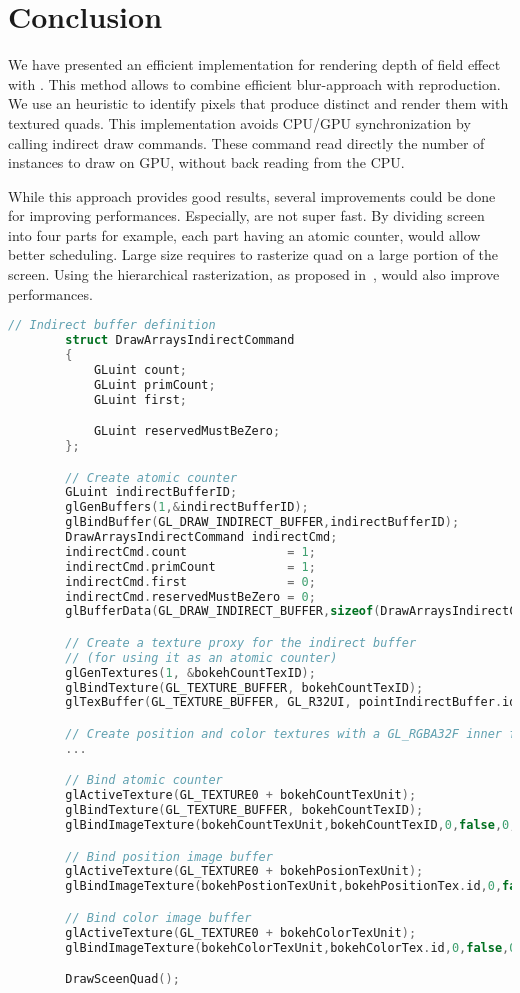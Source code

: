 \section{Conclusion}
We have presented an efficient implementation for rendering depth of field effect with \bokehs. This method allows to combine efficient blur-approach with \bokeh reproduction. We use an heuristic to identify pixels that produce distinct \bokeh and render them with textured quads. This implementation avoids CPU/GPU synchronization by calling indirect draw commands. These command read directly the number of instances to draw on GPU, without back reading from the CPU.


While this approach provides good results, several improvements could be done for improving performances. Especially,  are not super fast. By dividing screen into four parts for example, each part having an atomic counter, would allow better scheduling. Large \coc size requires to rasterize quad on a large portion of the screen. Using the hierarchical rasterization, as proposed in~\cite{Futurmark11}, would also improve performances.



\begin{lstlisting}[language=C++,float={htb},caption={Host application for extracting \bokehs \emph{(Pass 2)}.},label={DeRousiers:bokehextractioncpp}]
		// Indirect buffer definition
		struct DrawArraysIndirectCommand
		{
			GLuint count;
			GLuint primCount;
			GLuint first;

			GLuint reservedMustBeZero;
		};

		// Create atomic counter
		GLuint indirectBufferID;
		glGenBuffers(1,&indirectBufferID);
		glBindBuffer(GL_DRAW_INDIRECT_BUFFER,indirectBufferID);
		DrawArraysIndirectCommand indirectCmd;
		indirectCmd.count              = 1;
		indirectCmd.primCount          = 1;
		indirectCmd.first              = 0;
		indirectCmd.reservedMustBeZero = 0;
		glBufferData(GL_DRAW_INDIRECT_BUFFER,sizeof(DrawArraysIndirectCommand),&indirecCmd,GL_DYNAMIC_DRAW);

		// Create a texture proxy for the indirect buffer 
		// (for using it as an atomic counter)
		glGenTextures(1, &bokehCountTexID);
		glBindTexture(GL_TEXTURE_BUFFER, bokehCountTexID);
		glTexBuffer(GL_TEXTURE_BUFFER, GL_R32UI, pointIndirectBuffer.id);

		// Create position and color textures with a GL_RGBA32F inner format
		...

		// Bind atomic counter
		glActiveTexture(GL_TEXTURE0 + bokehCountTexUnit);
		glBindTexture(GL_TEXTURE_BUFFER, bokehCountTexID);
		glBindImageTexture(bokehCountTexUnit,bokehCountTexID,0,false,0,GL_READ_WRITE,GL_R32UI);

		// Bind position image buffer
		glActiveTexture(GL_TEXTURE0 + bokehPosionTexUnit);
		glBindImageTexture(bokehPostionTexUnit,bokehPositionTex.id,0,false,0,GL_READ_WRITE,GL_RGBA32F);

		// Bind color image buffer
		glActiveTexture(GL_TEXTURE0 + bokehColorTexUnit);
		glBindImageTexture(bokehColorTexUnit,bokehColorTex.id,0,false,0,GL_READ_WRITE,GL_RGBA32F);

		DrawSceenQuad();
\end{lstlisting}


